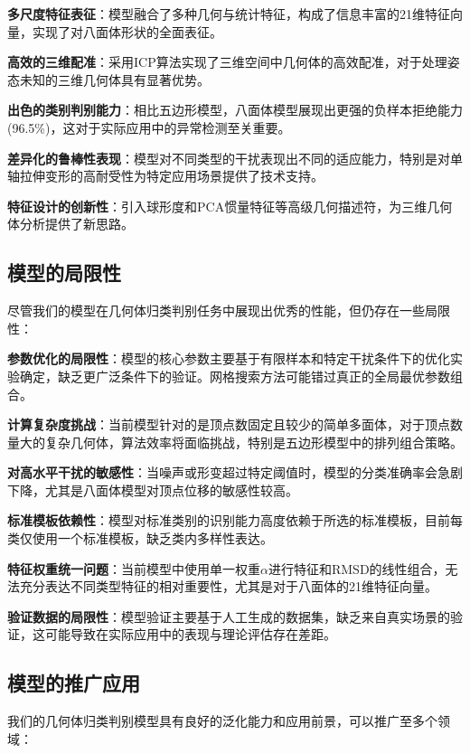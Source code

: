      \textbf{多尺度特征表征}：模型融合了多种几何与统计特征，构成了信息丰富的21维特征向量，实现了对八面体形状的全面表征。
    
     \textbf{高效的三维配准}：采用ICP算法实现了三维空间中几何体的高效配准，对于处理姿态未知的三维几何体具有显著优势。
    
     \textbf{出色的类别判别能力}：相比五边形模型，八面体模型展现出更强的负样本拒绝能力(96.5\%)，这对于实际应用中的异常检测至关重要。
    
     \textbf{差异化的鲁棒性表现}：模型对不同类型的干扰表现出不同的适应能力，特别是对单轴拉伸变形的高耐受性为特定应用场景提供了技术支持。
    
     \textbf{特征设计的创新性}：引入球形度和PCA惯量特征等高级几何描述符，为三维几何体分析提供了新思路。


\subsection{模型的局限性}

尽管我们的模型在几何体归类判别任务中展现出优秀的性能，但仍存在一些局限性：


     \textbf{参数优化的局限性}：模型的核心参数主要基于有限样本和特定干扰条件下的优化实验确定，缺乏更广泛条件下的验证。网格搜索方法可能错过真正的全局最优参数组合。
    
     \textbf{计算复杂度挑战}：当前模型针对的是顶点数固定且较少的简单多面体，对于顶点数量大的复杂几何体，算法效率将面临挑战，特别是五边形模型中的排列组合策略。
    
     \textbf{对高水平干扰的敏感性}：当噪声或形变超过特定阈值时，模型的分类准确率会急剧下降，尤其是八面体模型对顶点位移的敏感性较高。
    
     \textbf{标准模板依赖性}：模型对标准类别的识别能力高度依赖于所选的标准模板，目前每类仅使用一个标准模板，缺乏类内多样性表达。
    
     \textbf{特征权重统一问题}：当前模型中使用单一权重$\alpha$进行特征和RMSD的线性组合，无法充分表达不同类型特征的相对重要性，尤其是对于八面体的21维特征向量。
    
     \textbf{验证数据的局限性}：模型验证主要基于人工生成的数据集，缺乏来自真实场景的验证，这可能导致在实际应用中的表现与理论评估存在差距。


\subsection{模型的推广应用}

我们的几何体归类判别模型具有良好的泛化能力和应用前景，可以推广至多个领域：


